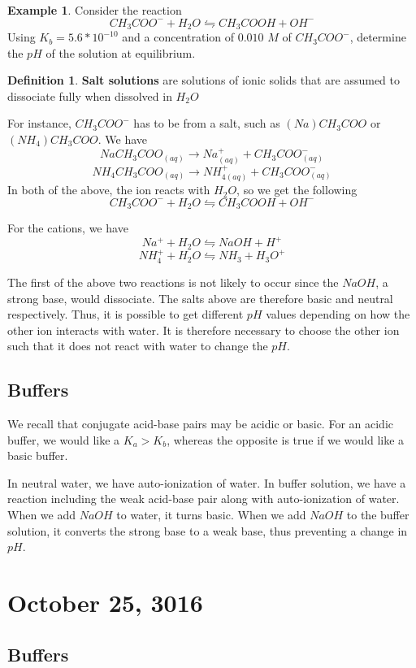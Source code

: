 \documentclass[11pt]{article}
\theoremstyle{plain} %
\theoremstyle{definition}
\newtheorem*{definition}{Definition} %
\theoremstyle{example}
\newtheorem*{example}{Example}
\theoremstyle{remark}
\begin{document}
\begin{example}
Consider the reaction $$CH_3COO^- +H_2O \leftrightharpoons CH_3COOH + OH^-$$ Using $K_b = 5.6*10^{-10}$ and a concentration of $0.010 $ $M$ of $CH_3COO^-$, determine the $pH$ of the solution at equilibrium.
\end{example}

\begin{definition}
\textbf{Salt solutions} are solutions of ionic solids that are assumed to dissociate fully when dissolved in $H_2O$ \end{definition}
For instance, $CH_3COO^-$ has to be from a salt, such as $(Na)CH_3COO$ or $(NH_4)CH_3COO$. We have $$NaCH_3COO_{(aq)}  \rightarrow Na_{(aq)}^+ + CH_3COO_{(aq)}^-$$ $$NH_4CH_3COO_{(aq)}  \rightarrow NH_{4(aq)}^+  + CH_3COO_{(aq)}^-$$ In both of the above, the ion reacts with $H_2O$, so we get the following $$CH_3COO^- + H_2O \leftrightharpoons CH_3COOH + OH^-$$

For the cations, we have 
$$Na^+ + H_2O \leftrightharpoons NaOH + H^+$$
$$NH_4^+ + H_2O \leftrightharpoons NH_3 + H_3O^+$$

The first of the above two reactions is not likely to occur since the $NaOH$, a strong base, would dissociate. The salts above are therefore basic and neutral respectively. Thus, it is possible to get different $pH$ values depending on how the other ion interacts with water. It is therefore necessary to choose the other ion such that it does not react with water to change the $pH$. 

\subsection{Buffers}

We recall that conjugate acid-base pairs may be acidic or basic. For an acidic buffer, we would like a $K_a > K_b$, whereas the opposite is true if we would like a basic buffer.

In neutral water, we have auto-ionization of water. In buffer solution, we have a reaction including the weak acid-base pair along with auto-ionization of water. When we add $NaOH$ to water, it turns basic. When we add $NaOH$ to the buffer solution, it converts the strong base to a weak base, thus preventing a change in $pH$. 


\section{October 25, 3016}
\subsection{Buffers}
\end{document}
